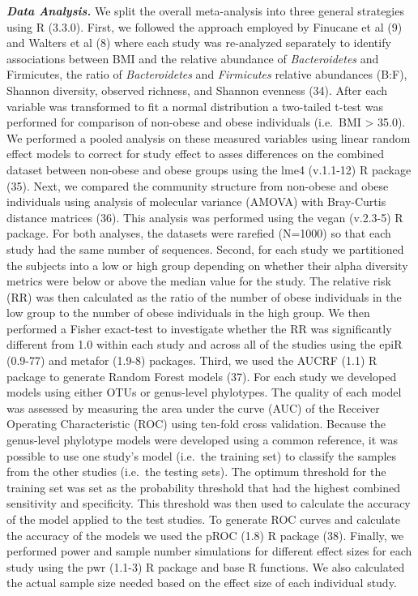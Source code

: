 \documentclass[12pt,]{article}
\begin{document}
\textbf{\emph{Data Analysis.}} We split the overall meta-analysis into
three general strategies using R (3.3.0). First, we followed the
approach employed by Finucane et al (9) and Walters et al (8) where each
study was re-analyzed separately to identify associations between BMI
and the relative abundance of \emph{Bacteroidetes} and Firmicutes, the
ratio of \emph{Bacteroidetes} and \emph{Firmicutes} relative abundances
(B:F), Shannon diversity, observed richness, and Shannon evenness (34).
After each variable was transformed to fit a normal distribution a
two-tailed t-test was performed for comparison of non-obese and obese
individuals (i.e.~BMI \textgreater{} 35.0). We performed a pooled
analysis on these measured variables using linear random effect models
to correct for study effect to asses differences on the combined dataset
between non-obese and obese groups using the lme4 (v.1.1-12) R package
(35). Next, we compared the community structure from non-obese and obese
individuals using analysis of molecular variance (AMOVA) with
Bray-Curtis distance matrices (36). This analysis was performed using
the vegan (v.2.3-5) R package. For both analyses, the datasets were
rarefied (N=1000) so that each study had the same number of sequences.
Second, for each study we partitioned the subjects into a low or high
group depending on whether their alpha diversity metrics were below or
above the median value for the study. The relative risk (RR) was then
calculated as the ratio of the number of obese individuals in the low
group to the number of obese individuals in the high group. We then
performed a Fisher exact-test to investigate whether the RR was
significantly different from 1.0 within each study and across all of the
studies using the epiR (0.9-77) and metafor (1.9-8) packages. Third, we
used the AUCRF (1.1) R package to generate Random Forest models (37).
For each study we developed models using either OTUs or genus-level
phylotypes. The quality of each model was assessed by measuring the area
under the curve (AUC) of the Receiver Operating Characteristic (ROC)
using ten-fold cross validation. Because the genus-level phylotype
models were developed using a common reference, it was possible to use
one study's model (i.e.~the training set) to classify the samples from
the other studies (i.e.~the testing sets). The optimum threshold for the
training set was set as the probability threshold that had the highest
combined sensitivity and specificity. This threshold was then used to
calculate the accuracy of the model applied to the test studies. To
generate ROC curves and calculate the accuracy of the models we used the
pROC (1.8) R package (38). Finally, we performed power and sample number
simulations for different effect sizes for each study using the pwr
(1.1-3) R package and base R functions. We also calculated the actual
sample size needed based on the effect size of each individual study.
\end{document}
